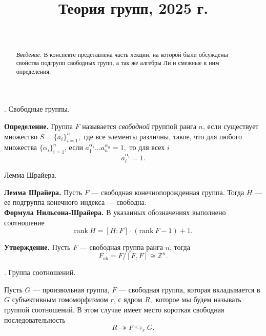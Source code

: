 \documentclass[
 aps, pra,
 amsmath,amssymb,
 11pt,
 final,
tightenlines,
 twoside,
 twocolumn,
 nofloats,
nofootinbib,
 superscriptaddress,
showkeys,
showkeywords,
 ]
{revtex4-2}
\begin{document}

\title{Теория групп, 2025 г.}

\author{~}

\begin{abstract}
\textit{Введение.} В конспекте представлена часть лекции, на которой были обсуждены свойства подгрупп свободных групп, а так же алгебры Ли и смежные к ним определения.
\end{abstract}

\maketitle

{

\begin{center}
{. Свободные группы.}
\end{center}

{\bf Определение.} Группа $F$ называется {\it свободной} группой ранга $n$, если существует множество $S = \{a_i\}^n_{i=1},$ где все элементы различны, такое, что для любого множества $\{\alpha_i\}^n_{i=1}$, если $a^{\alpha_1}_1\ldots a^{\alpha_n}_n = 1,$ то для всех $i$ $$a^{\alpha_i}_i=1.$$

\begin{center}
{ Лемма Шрайера.}
\end{center}

{\bf Лемма Шрайера.} Пусть $F$ --- свободная конечнопорожденная группа. Тогда $H$ --- ее подгруппа конечного индекса --- свободна. \\

{\bf Формула Нильсона-Шрайера.} В указанных обозначениях выполнено соотношение 
$$
\text{rank} \ H = [H:F] \cdot (\text{rank} \ F - 1) + 1. 
$$

{ \bf Утверждение. } Пусть $F$ --- свободная группа ранга $n$, тогда 
$$
F_{ab} = F / [F, F] \cong \mathbb{Z}^n.
$$ 



\hrulefill

\begin{center}
{. Группа соотношений.}
\end{center}

Пусть $G$ --- произвольная группа, $F$ --- свободная группа, которая вкладывается в $G$ субъективным гомоморфизмом $r$, с ядром $R,$ которое мы будем называть группой соотношений. В этом случае имеет место короткая свободная последовательность
$$
R \twoheadrightarrow F \hookrightarrow_r G.
$$

}
\end{document}
